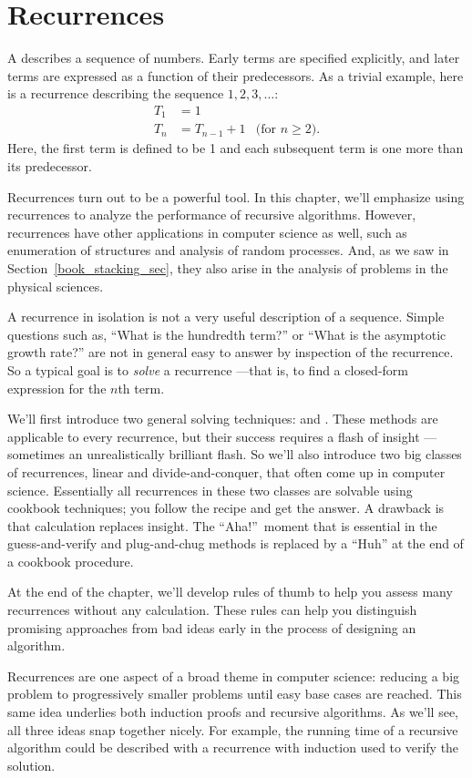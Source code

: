\part{Recurrences}\label{part:recurrences}

\partintro

A  describes a sequence of numbers.  Early terms are
specified explicitly, and later terms are expressed as a function of
their predecessors.  As a trivial example, here is a recurrence describing
the sequence $1, 2, 3,\dots$:
\begin{align*}
T_1 & = 1 \\
T_n & = T_{n-1} + 1 & \text{(for $n \geq 2$)}.
\end{align*}
Here, the first term is defined to be 1 and each subsequent term is
one more than its predecessor.

Recurrences turn out to be a powerful tool.  In this chapter, we'll
emphasize using recurrences to analyze the performance of recursive
algorithms.  However, recurrences have other applications in computer
science as well, such as enumeration of structures and analysis of
random processes.  And, as we saw in Section~\ref{book_stacking_sec},
they also arise in the analysis of problems in the physical sciences.

A recurrence in isolation is not a very useful description of a
sequence.  Simple questions such as, ``What is the hundredth term?''
or ``What is the asymptotic growth rate?''  are not in general easy to
answer by inspection of the recurrence.  So a typical goal is to
\emph{solve} a recurrence ---that is, to find a closed-form expression
for the $n$th term.

We'll first introduce two general solving techniques:
 and .  These methods are
applicable to every recurrence, but their success requires a flash of
insight ---sometimes an unrealistically brilliant flash.  So we'll
also introduce two big classes of recurrences, linear and
divide-and-conquer, that often come up in computer science.
Essentially all recurrences in these two classes are solvable using
cookbook techniques; you follow the recipe and get the answer.  A
drawback is that calculation replaces insight.  The ``Aha!''\ moment
that is essential in the guess-and-verify and plug-and-chug methods is
replaced by a ``Huh'' at the end of a cookbook procedure.

At the end of the chapter, we'll develop rules of thumb to help you
assess many recurrences without any calculation.  These rules can help
you distinguish promising approaches from bad ideas early in the
process of designing an algorithm.

Recurrences are one aspect of a broad theme in computer science:
reducing a big problem to progressively smaller problems until easy
base cases are reached.  This same idea underlies both induction
proofs and recursive algorithms.  As we'll see, all three ideas snap
together nicely.  For example, the running time of a recursive
algorithm could be described with a recurrence with induction used to
verify the solution.

\endinput
